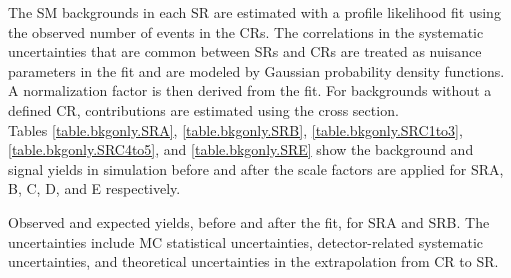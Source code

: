The SM backgrounds in each SR are estimated with a profile likelihood fit using the observed number of events in the CRs.  The correlations in the systematic uncertainties that are common between SRs and CRs  are treated as nuisance parameters in the fit and are modeled by Gaussian probability density functions.  A normalization factor is then derived from the fit.  For backgrounds without a defined CR, contributions are estimated using the cross section.  \\


Tables \ref{table.bkgonly.SRA}, \ref{table.bkgonly.SRB}, \ref{table.bkgonly.SRC1to3}, \ref{table.bkgonly.SRC4to5}, and \ref{table.bkgonly.SRE} show the background and signal yields in simulation before and after the scale factors are applied for SRA, B, C, D, and E respectively. %

%    


%
\begin{table}[htpb]
  \caption{Observed and expected yields, before and after the fit, for SRA and SRB.
The uncertainties include MC statistical uncertainties, detector-related systematic uncertainties, and theoretical uncertainties in the extrapolation from CR to SR.}
  \begin{center}
  \small
{\renewcommand{\arraystretch}{1.2}

}
\end{center}
\label{tab:srABYields}
\end{table}

